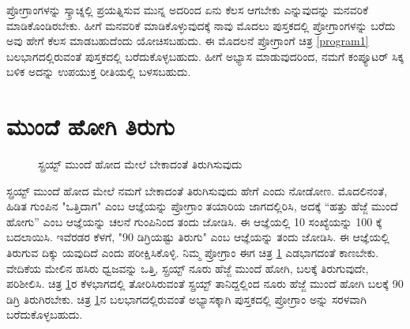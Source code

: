 ಪ್ರೋಗ್ರಾಂಗಳನ್ನು ಸ್ಕ್ರಾಚ್ನಲ್ಲಿ ಪ್ರಯತ್ನಿಸುವ ಮುನ್ನ ಅದರಿಂದ ಏನು ಕೆಲಸ ಆಗಬೇಕು ಎನ್ನುವುದನ್ನು ಮನವರಿಕೆ ಮಾಡಿಕೊಂಡಿರಬೇಕು. ಹೀಗೆ ಮನವರಿಕೆ ಮಾಡಿಕೊಳ್ಳುವುದಕ್ಕೆ ನಾವು ಮೊದಲು ಪುಸ್ತಕದಲ್ಲಿ ಪ್ರೋಗ್ರಾಂಗಳನ್ನು ಬರೆದು ಅವು ಹೇಗೆ ಕೆಲಸ ಮಾಡಬಹುದೆಂದು ಯೋಚಿಸಬಹುದು.  ಈ ಮೊದಲನೆ ಪ್ರೋಗ್ರಾಂಗೆ ಚಿತ್ರ \ref{program1} ಬಲಭಾಗದಲ್ಲಿರುವಂತೆ ಪುಸ್ತಕದಲ್ಲಿ  ಬರೆದುಕೊಳ್ಳಬಹುದು.  ಹೀಗೆ ಅಭ್ಯಾಸ ಮಾಡುವುದರಿಂದ, ನಮಗೆ ಕಂಪ್ಯೂಟರ್ ಸಿಕ್ಕ ಬಳಿಕ ಅದನ್ನು ಉಪಯುಕ್ತ ರೀತಿಯಲ್ಲಿ ಬಳಸಬಹುದು. 

\section{ಮುಂದೆ ಹೋಗಿ ತಿರುಗು}
\label{wait}
\begin{figure}[h]
\begin{center}
\begin{multicols}{2}
\begin{Scratch}[1]
\beginbox{}
\end{Scratch}


\end{multicols}

\end{center}
\caption{ಸ್ಪ್ರಯ್ಟ್ ಮುಂದೆ ಹೋದ ಮೇಲೆ ಬೇಕಾದಂತೆ ತಿರುಗಿಸುವುದು}
\label{program2}
\end{figure}

ಸ್ಪ್ರಯ್ಟ್ ಮುಂದೆ ಹೋದ ಮೇಲೆ ನಮಗೆ ಬೇಕಾದಂತೆ ತಿರುಗಿಸುವುದು ಹೇಗೆ ಎಂದು ನೋಡೋಣ. ಮೊದಲಿನಂತೆ, ಹಿಡಿತ ಗುಂಪಿನ "ಒತ್ತಿದಾಗ" ಎಂಬ ಆಜ್ಞೆಯನ್ನು ಪ್ರೋಗ್ರಾಂ ತಯಾರಿಯ ಜಾಗದಲ್ಲಿರಿಸಿ, ಅದಕ್ಕೆ “ಹತ್ತು ಹೆಜ್ಜೆ ಮುಂದೆ ಹೋಗು” ಎಂಬ ಆಜ್ಞೆಯನ್ನು ಚಲನೆ ಗುಂಪಿನಿಂದ ತಂದು ಜೋಡಿಸಿ.  ಈ ಆಜ್ಞೆಯಲ್ಲಿ 10 ಸಂಖ್ಯೆಯನ್ನು 100 ಕ್ಕೆ ಬದಲಾಯಿಸಿ.  ಇವೆರಡರ ಕೆಳಗೆ,  "90 ಡಿಗ್ರಿಯಷ್ಟು ತಿರುಗು" ಎಂಬ ಆಜ್ಞೆಯನ್ನು ತಂದು ಜೋಡಿಸಿ.  ಈ ಆಜ್ಞೆಯಲ್ಲಿ ತಿರುಗುವ ದಿಕ್ಕು ಯವುದಿದೆ ಎಂದು ಪರೀಕ್ಷಿಸಿಕೊಳ್ಳಿ. ನಿಮ್ಮ ಪ್ರೋಗ್ರಾಂ ಈಗ ಚಿತ್ರ \ref{program2}  ಎಡಭಾಗದಂತೆ ಕಾಣಬೇಕು.    ವೇದಿಕೆಯ ಮೇಲಿನ ಹಸಿರು ಧ್ವಜವನ್ನು ಒತ್ತಿ,  ಸ್ಪ್ರಯ್ಟ್ ನೂರು ಹೆಜ್ಜೆ ಮುಂದೆ ಹೋಗಿ, ಬಲಕ್ಕೆ ತಿರುಗುವುದೇ, ಪರಿಶೀಲಿಸಿ.  ಚಿತ್ರ \ref{program2}ರ ಕೆಳಭಾಗದಲ್ಲಿ ತೋರಿಸಿರುವಂತೆ ಸ್ಪ್ರಯ್ಟ್ ತಾನಿದ್ದಲ್ಲಿಂದ ನೂರು ಹೆಜ್ಜೆ ಮುಂದೆ ಹೋಗಿ ಬಲಕ್ಕೆ 90 ಡಿಗ್ರಿ ತಿರುಗಿರಬೇಕು.  ಚಿತ್ರ \ref{program2}ನ ಬಲಭಾಗದಲ್ಲಿರುವಂತೆ  ಅಭ್ಯಾಸಕ್ಕಾಗಿ ಪುಸ್ತಕದಲ್ಲಿ  ಪ್ರೋಗ್ರಾಂ ಅನ್ನು ಸರಳವಾಗಿ ಬರೆದುಕೊಳ್ಳಬಹುದು. 

